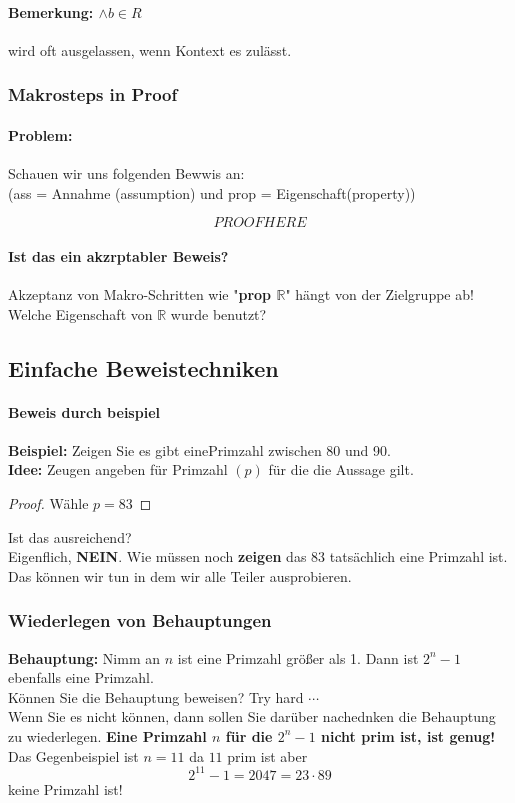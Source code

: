         \paragraph{Bemerkung: $\land b \in R$} 
        wird oft ausgelassen, wenn Kontext es zulässt.

    \subsubsection{Makrosteps in Proof}
        \paragraph{Problem: } 
        Schauen wir uns folgenden Bewwis an: \\ (ass = Annahme (assumption) und prop = Eigenschaft(property))

        \[
            PROOF HERE    
        \]

        \paragraph{Ist das ein akzrptabler Beweis?} 
        Akzeptanz von Makro-Schritten wie "\textbf{prop $\mathbb{R}$}" hängt von der Zielgruppe ab! \\ Welche Eigenschaft von $\mathbb{R}$ wurde benutzt?

    \subsection{Einfache Beweistechniken}
        \paragraph{Beweis durch beispiel}
        \textbf{Beispiel: } Zeigen Sie es gibt einePrimzahl zwischen 80 und 90.\\ \textbf{Idee: } Zeugen angeben für Primzahl $(p)$ für die die Aussage gilt.
        \begin{proof}
            Wähle $p = 83$
        \end{proof} 
        Ist das ausreichend?\\Eigenflich, \textbf{NEIN}. Wie müssen noch \textbf{zeigen} das 83 tatsächlich eine Primzahl ist. \\Das können wir tun in dem wir alle Teiler ausprobieren. 

            \subsubsection{Wiederlegen von Behauptungen} 
            \textbf{Behauptung: } Nimm an $n$ ist eine Primzahl größer als 1. Dann ist $2^n - 1$ ebenfalls eine Primzahl. \\Können Sie die Behauptung beweisen? Try hard $\cdots$\\ Wenn Sie es nicht können, dann sollen Sie darüber nachednken die Behauptung zu wiederlegen. \textbf{Eine Primzahl $n$ für die $2^n - 1$ nicht prim ist, ist genug!}\\ Das Gegenbeispiel ist $n = 11$ da $11$ prim ist aber \[2^{11} - 1 = 2047 = 23 \cdot 89\] keine Primzahl ist!

